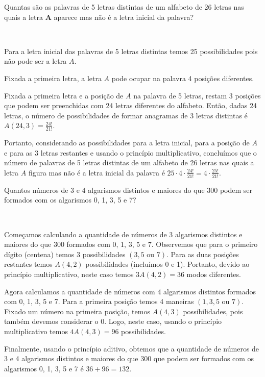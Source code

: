 \documentclass[a4paper, 12pt, addpoints]{exam}
\begin{document}
\begin{questions}
\question Quantas são as palavras de 5 letras distintas de um alfabeto de 26 letras nas quais a letra \textbf{A} aparece mas não é a letra inicial da palavra?

\begin{resp}~

  Para a letra inicial das palavras de 5 letras distintas temos 25 possibilidades pois não pode ser a letra $A$.

Fixada a primeira letra, a letra $A$ pode ocupar na palavra 4 posições diferentes.

Fixada a primeira letra e a posição de $A$ na palavra de 5 letras, restam 3 posições que podem ser preenchidas com 24 letras diferentes do alfabeto. Então, dadas 24 letras, o número de possibilidades de formar anagramas de 3 letras distintas é $A(24, 3) = \frac{24!}{21!}$.

Portanto, considerando as possibilidades para a letra inicial, para a posição de $A$ e para as 3 letras restantes e usando o princípio multiplicativo, concluímos que o número de palavras de 5 letras distintas de um alfabeto de 26 letras nas quais a letra $A$ figura mas não é a letra inicial da palavra é $25 \cdot 4 \cdot \frac{24!}{21!} = 4 \cdot \frac{25!}{21!}$.

\end{resp}

\question Quantos números de 3 e 4 algarismos distintos e maiores do que 300 podem ser formados com os algarismos 0, 1, 3, 5 e 7?

\begin{resp}~

  Começamos calculando a quantidade de números de 3 algarismos distintos e maiores do que 300 formados com 0, 1, 3, 5 e 7. Observemos que para o primeiro dígito (centena) temos 3 possibilidades $(3, 5 \text{ ou } 7)$. Para as duas posições restantes temos $A(4, 2)$ possibilidades (incluímos 0 e 1). Portanto, devido ao princípio multiplicativo, neste caso temos $3A(4, 2) = 36$ modos diferentes.

Agora calculamos a quantidade de números com 4 algarismos distintos formados com 0, 1, 3, 5 e 7. Para a primeira posição temos 4 maneiras $(1, 3, 5 \text{ ou } 7)$. Fixado um número na primeira posição, temos $A(4, 3)$ possibilidades, pois também devemos considerar o 0. Logo, neste caso, usando o princípio multiplicativo temos $4A(4, 3) = 96$ possibilidades.

Finalmente, usando o princípio aditivo, obtemos que a quantidade de números de 3 e 4 algarismos distintos e maiores do que 300 que podem ser formados com os algarismos 0, 1, 3, 5 e 7 é $36 + 96 = 132$.


\end{resp}
\end{questions}
\end{document}
